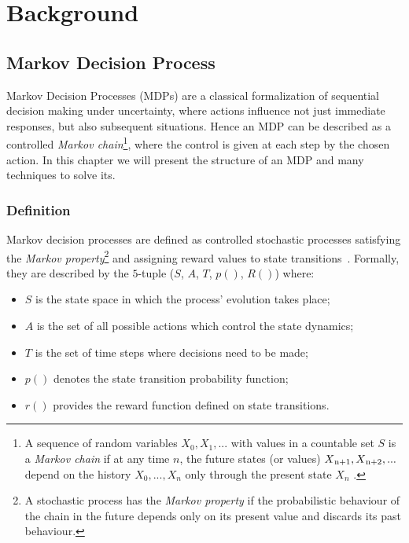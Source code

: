 \chapter{Background}

\section{Markov Decision Process}

Markov Decision Processes (MDPs) are a classical formalization of sequential decision making under uncertainty, where actions influence not just immediate responses, but also subsequent situations. Hence an MDP can be described as a controlled \textit{Markov chain}\footnote{A sequence of random variables $X_0, X_1, . . . $ with values in a countable set $S$ is a \textit{Markov chain} if at any time $n$, the future states (or values) $X\textsubscript{n+1}, X\textsubscript{n+2}, . . .$ depend on the history $X_0, . . . , X_n$ only through the present state $X_n$ \cite{konstantopoulos2009markov}.}, where the control is given at each step by the chosen action. In this chapter we will present the structure of an MDP and many techniques to solve its.

\subsection{Definition} Markov decision processes are defined as controlled stochastic processes satisfying the \textit{Markov property}\footnote{A stochastic process has the \textit{Markov property} if the probabilistic behaviour of the chain in the future depends only on its present value and discards its past behaviour.} and assigning reward values to state transitions~\cite{Put94}.  Formally, they are described by the $5$-tuple ($S$, $A$, $T$, $p()$, $R()$) where:

\begin{itemize}
	\item $S$ is the state space in which the process’ evolution takes place;
	\item $A$ is the set of all possible actions which control the state dynamics;
	\item $T$ is the set of time steps where decisions need to be made;
	\item $p()$ denotes the state transition probability function;
	\item $r()$ provides the reward function defined on state transitions.	
\end{itemize}

